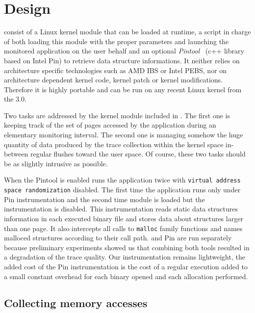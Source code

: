 \section{Design}
\label{sec:design}

\Moca consist of a Linux kernel module that can be loaded at runtime,  a script
in charge of both loading this module with the proper parameters and launching the
monitored application on the user behalf
and an optional \emph{Pintool}~\cite{Luk05Pin} (c++ library based on Intel Pin) to retrieve data
structure informations.
It neither relies on architecture specific
technologies such as AMD IBS or Intel PEBS, nor on architecture dependent kernel
code, kernel patch or kernel modifications.
Therefore it is highly portable and can be run on any recent Linux kernel
from the $3.0$.

Two tasks are addressed by the kernel module included in \Moca. The first one is
keeping track of the set of pages accessed by the application during an elementary monitoring
interval. The second one is managing somehow the huge quantity of data produced
by the trace collection within the kernel space in-between regular flushes toward
the user space. Of course, these two tasks should be as slightly intrusive as possible.

When the Pintool is enabled \Moca runs the application twice with \texttt{virtual
address space randomization} disabled. The first time the application runs only
under Pin instrumentation and the second time \Moca module is loaded but the
instrumentation is disabled. This instrumentation reads static data
structures information in each executed binary file and stores data about structures larger than
one page. It also intercepts all calls to \texttt{malloc} family functions
and names malloced structures according to their call path.
\Moca and Pin are run separately because preliminary experiments showed us that combining both
tools resulted in a degradation of the trace quality. Our instrumentation remains lightweight, the
added cost of the Pin instrumentation is the cost of a regular execution 
added to a small constant overhead for each binary opened and each allocation performed.

\subsection{Collecting memory accesses}

